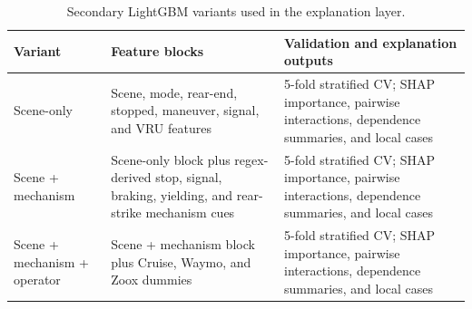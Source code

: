 \begin{table}[H]
\centering
\caption{Secondary LightGBM variants used in the explanation layer.}
\label{tab:lightgbm_config}
\scriptsize
\renewcommand{\arraystretch}{1.08}
\begin{tabular}{p{2.8cm}p{5.2cm}p{5.2cm}}
\toprule
Variant & Feature blocks & Validation and explanation outputs \\
\midrule
Scene-only & Scene, mode, rear-end, stopped, maneuver, signal, and VRU features & 5-fold stratified CV; SHAP importance, pairwise interactions, dependence summaries, and local cases \\
Scene + mechanism & Scene-only block plus regex-derived stop, signal, braking, yielding, and rear-strike mechanism cues & 5-fold stratified CV; SHAP importance, pairwise interactions, dependence summaries, and local cases \\
Scene + mechanism + operator & Scene + mechanism block plus Cruise, Waymo, and Zoox dummies & 5-fold stratified CV; SHAP importance, pairwise interactions, dependence summaries, and local cases \\
\bottomrule
\end{tabular}
\end{table}
